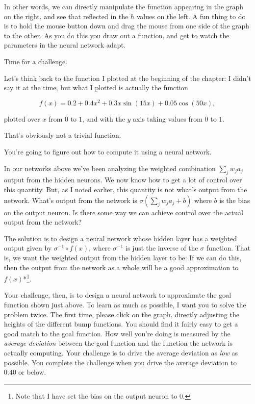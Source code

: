 In other words, we can directly manipulate the function appearing in the graph on the right, and see that reflected in the $h$ values on the left. A fun thing to do is to hold the mouse button down and drag the mouse from one side of the graph to the other. As you do this you draw out a function, and get to watch the parameters in the neural network adapt.


Time for a challenge.


Let's think back to the function I plotted at the beginning of the chapter: I didn't say it at the time, but what I plotted is actually the function

\begin{equation}
f(x) = 0.2+0.4 x^2+0.3x \sin(15 x) + 0.05 \cos(50 x),
\tag{113}
\end{equation}

\noindent plotted over $x$ from $0$ to $1$, and with the $y$ axis taking values from $0$ to $1$.


That's obviously not a trivial function.


You're going to figure out how to compute it using a neural network.


In our networks above we've been analyzing the weighted combination $\sum_j w_j a_j$ output from the hidden neurons. We now know how to get a lot of control over this quantity. But, as I noted earlier, this quantity is not what's output from the network. What's output from the network is $\sigma(\sum_j w_j a_j + b)$ where $b$ is the bias on the output neuron. Is there some way we can achieve control over the actual output from the network?


The solution is to design a neural network whose hidden layer has a weighted output given by $\sigma^{-1} \circ f(x)$, where $\sigma^{-1}$ is just the inverse of the $\sigma$ function. That is, we want the weighted output from the hidden layer to be: If we can do this, then the output from the network as a whole will be a good approximation to $f(x)$*\footnote{Note that I have set the bias on the output neuron to $0$.}.


Your challenge, then, is to design a neural network to approximate the goal function shown just above. To learn as much as possible, I want you to solve the problem twice. The first time, please click on the graph, directly adjusting the heights of the different bump functions. You should find it fairly easy to get a good match to the goal function. How well you're doing is measured by the \emph{average deviation} between the goal function and the function the network is actually computing. Your challenge is to drive the average deviation as \emph{low} as possible. You complete the challenge when you drive the average deviation to $0.40$ or below.


